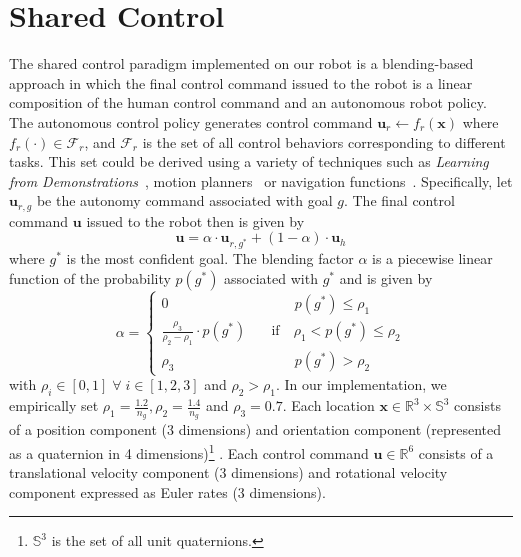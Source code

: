 \section{Shared Control}\label{sec:shared-control}
The shared control paradigm implemented on our robot is a blending-based approach in  which the final control command issued to the robot is a linear composition of the human control command and an autonomous robot policy.
The autonomous control policy generates control command
$\boldsymbol{u}_r \leftarrow f_{r}(\boldsymbol{x})$
where $f_{r}(\cdot) \in \mathcal{F}_{r}$, and $\mathcal{F}_{r}$ is the set of all control behaviors corresponding to different tasks. This set could be derived using a variety of techniques such as \textit{Learning from Demonstrations}~\cite{argall2009survey, schaal1997learning}, motion planners~\cite{hsu2002randomized,ratliff2009chomp} or navigation functions~\cite{rimon1992exact,tanner2003nonholonomic}. Specifically, let $\boldsymbol{u}_{r,g}$ be the autonomy command associated with goal $g$. The final control command $\boldsymbol{u}$ issued to the robot then is given by
\begin{equation*}
\boldsymbol{u} = \alpha\cdot \boldsymbol{u}_{r,g^*} + (1 - \alpha)\cdot \boldsymbol{u}_h
\end{equation*}
where $g^*$ is the most confident goal. The blending factor $\alpha$ is a piecewise linear function of the probability $p(g^*)$ associated with $g^*$ and is given by
$$
\alpha = \left\{
\begin{array}{ll}
0 & \quad\quad~~~ p(g^*) \leq \rho_1 \\
\frac{\rho_3}{\rho_2 - \rho_1}\cdot p(g^*) &  \quad \text{if}\quad \rho_1 < p(g^*) \leq \rho_2  \\
\rho_3 & \quad\quad~~~ p(g^*) > \rho_2 	
\end{array}
\right.
$$
with $\rho_i \in [0, 1] \;\forall\; i \in [1,2,3]$ and $ \rho_2 > \rho_1$. 
In our implementation, we empirically set $\rho_1 = \frac{1.2}{n_g}, \rho_2 = \frac{1.4}{n_g}$ and $ \rho_3 = 0.7$. Each location $\boldsymbol{x} \in \mathbb{R}^3 \times \mathbb{S}^3$ consists of a position component (3 dimensions) and orientation component (represented as a quaternion in 4 dimensions)\footnote{$\mathbb{S}^3$ is the set of all unit quaternions.} . Each control command $\boldsymbol{u} \in \mathbb{R}^6$ consists of a translational velocity component (3 dimensions) and rotational velocity component expressed as Euler rates (3 dimensions).

